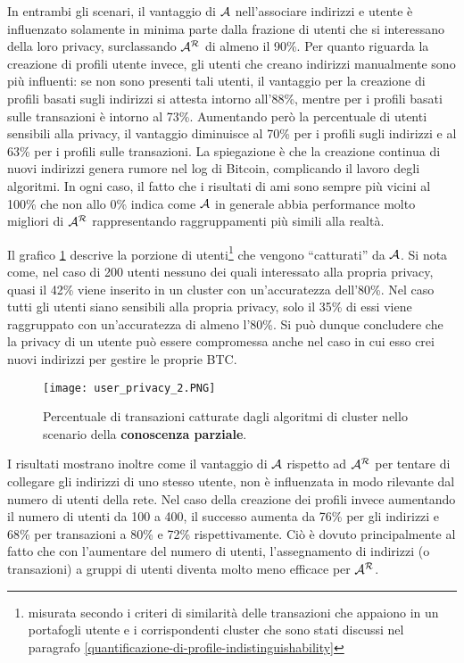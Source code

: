 In entrambi gli scenari, il vantaggio di $\mathcal{A}$ nell'associare indirizzi e utente è influenzato solamente in minima parte dalla frazione di utenti che si interessano della loro privacy, surclassando $\mathcal{A}^\mathcal{R}$ di almeno il 90\%.
Per quanto riguarda la creazione di profili utente invece, gli utenti che creano indirizzi manualmente sono più influenti: se non sono presenti tali utenti, il vantaggio per la creazione di profili basati sugli indirizzi si attesta intorno all'88\%, mentre per i profili basati sulle transazioni è intorno al 73\%. Aumentando però la percentuale di utenti sensibili alla privacy, il vantaggio diminuisce al 70\% per i profili sugli indirizzi e al 63\% per i profili sulle transazioni.
La spiegazione è che la creazione continua di nuovi indirizzi genera rumore nel log di Bitcoin, complicando il lavoro degli algoritmi. In ogni caso, il fatto che i risultati di \gls{ami} sono sempre più vicini al 100\% che non allo 0\% indica come $\mathcal{A}$ in generale abbia performance molto migliori di $\mathcal{A}^\mathcal{R}$ rappresentando raggruppamenti più simili alla realtà.

Il grafico \ref{userprivacy_fig_2} descrive la porzione di utenti\footnote{misurata secondo i criteri di similarità delle transazioni che appaiono in un portafogli utente e i corrispondenti cluster che sono stati discussi nel paragrafo \ref{quantificazione-di-profile-indistinguishability}} che vengono ``catturati'' da $\mathcal{A}$. Si nota come, nel caso di 200 utenti nessuno dei quali interessato alla propria privacy, quasi il 42\%  viene inserito  in un cluster con un'accuratezza dell'80\%. Nel caso tutti gli utenti siano sensibili alla propria privacy, solo il 35\% di essi viene raggruppato con un'accuratezza di almeno l'80\%. Si può dunque concludere che la privacy di un utente può essere compromessa anche nel caso in cui esso crei nuovi indirizzi per gestire le proprie BTC.

\begin{figure}[htbp]
\centering
\texttt{[image: user\_privacy\_2.PNG]}
\caption[Transazioni associate ad utenti con conoscenza parziale]{Percentuale di transazioni catturate dagli algoritmi di cluster nello scenario della \textbf{conoscenza parziale}.\label{userprivacy_fig_2}}
\end{figure}

I risultati mostrano inoltre come il vantaggio di $\mathcal{A}$ rispetto ad $\mathcal{A}^\mathcal{R}$ per tentare di collegare gli indirizzi di uno stesso utente, non è influenzata in modo rilevante dal numero di utenti della rete.
Nel caso della creazione dei profili invece aumentando il numero di utenti da 100 a 400, il successo aumenta da 76\% per gli indirizzi e 68\% per transazioni a 80\% e 72\% rispettivamente. Ciò è dovuto principalmente al fatto che con l'aumentare del numero di utenti, l'assegnamento di indirizzi (o transazioni) a gruppi di utenti diventa molto meno efficace per $\mathcal{A}^\mathcal{R}$.

